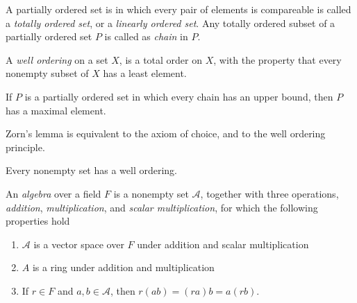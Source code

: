 \documentclass[12pt]{article}
\begin{document}
\begin{definition}
    A partially ordered set is in which every pair of elements is compareable is called a \textit{totally ordered set}, or a \textit{linearly ordered set}. Any totally ordered subset of a partially ordered set $P$ is called as \textit{chain} in $P$.
\end{definition}
\begin{definition}
    A \textit{well ordering} on a set $X$, is a total order on $X$, with the property that every nonempty subset of $X$ has a least element.
\end{definition}
\begin{lemma}
    If $P$ is a partially ordered set in which every chain has an upper bound, then $P$ has a maximal element.
\end{lemma}
\begin{remark}
    Zorn's lemma is equivalent to the axiom of choice, and to the well ordering principle.
\end{remark}
\begin{theorem}
    Every nonempty set has a well ordering.
\end{theorem}
\begin{definition}[Algebra]
    An \textit{algebra} over a field $F$ is a nonempty set $\mathcal{A}$, together with three operations, \textit{addition}, \textit{multiplication}, and \textit{scalar multiplication}, for which the following properties hold
    \begin{enumerate}
        \item $\mathcal{A}$ is a vector space over $F$ under addition and scalar multiplication
        \item $A$ is a ring under addition and multiplication
        \item If $r\in F$ and $a,b\in \mathcal{A}$, then $r(ab)=(ra)b=a(rb)$.
    \end{enumerate}
\end{definition}

\newpage
\end{document}
